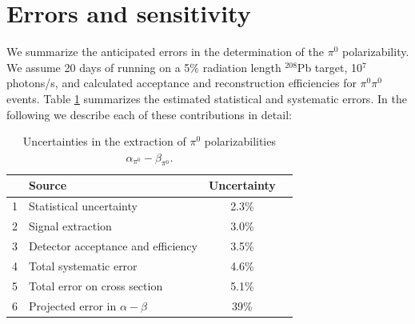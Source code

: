 \section{Errors and sensitivity}
We summarize the anticipated errors in the determination of the $\pi^0$ polarizability. We assume 
20 days of running on a 5\% radiation length $^{208}$Pb target, 10$^7$ photons/s, and calculated acceptance and reconstruction efficiencies for $\pi^0 \pi^0$ events.
Table \ref{errors} summarizes the estimated statistical and systematic errors. In the following we describe each of
these contributions in detail: 

\begin{table}[bt]
\caption{Uncertainties in the extraction of $\pi^0$ polarizabilities $\alpha_{\pi^0}-\beta_{\pi^0}$.
\label{errors}
}
\begin{center}
\begin{tabular}{|l|l|c|c|}
\hline
\hline
  &  {\bf Source}  & {\bf Uncertainty}   \\  \hline \hline
  1 & Statistical uncertainty  &  2.3\%    \\ \hline
  2 & Signal extraction  & 3.0\%  \\ \hline
  3 & Detector acceptance and efficiency &  3.5\%   \\ \hline
  4 & Total systematic error  &  4.6\% \\ \hline
  5 & Total error on cross section  &  5.1\% \\ \hline
  6 & Projected error in $\alpha - \beta$ &  39\%  \\ 
 \hline
 \hline
\end{tabular}
\end{center}
\end{table}

